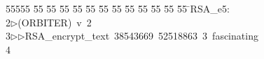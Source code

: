 %
%
\begin{tabbing}
55555 \= 55 \= 55 \= 55 \= 55 \= 55 \= 55 \= 55 \= 55 \= 55 \= 55 \= 55 \= 55 \= \>RSA\_e5:\\[0pt]
2\>$\triangleright$\>(ORBITER)\ v\ 2\ \\[0pt]
3\>$\triangleright$\>$\triangleright$\>RSA\_encrypt\_text\ 38543669\ 52518863\ 3\ fascinating\\[0pt]
4\>\end{tabbing}
